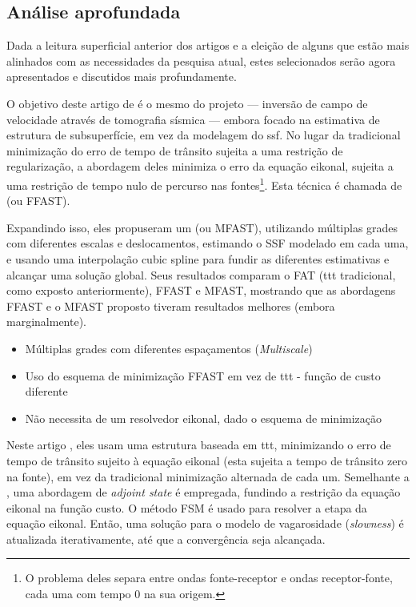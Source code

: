 \subsection{Análise aprofundada}
\label{sec_rt:subsec_deeper-analysis}

Dada a leitura superficial anterior dos artigos e a eleição de alguns que estão mais alinhados com as necessidades da pesquisa atual, estes selecionados serão agora apresentados e discutidos mais profundamente.


O objetivo deste artigo de \cite{li_multiscale_2024} é o mesmo do projeto --- inversão de campo de velocidade através de tomografia sísmica --- embora focado na estimativa de estrutura de subsuperfície, em vez da modelagem do \gls{ssf}. No lugar da tradicional minimização do erro de tempo de trânsito sujeita a uma restrição de regularização, a abordagem deles minimiza o erro da equação eikonal, sujeita a uma restrição de tempo nulo de percurso nas fontes\footnote{O problema deles separa entre ondas fonte-receptor e ondas receptor-fonte, cada uma com tempo $0$ na sua origem.}. Esta técnica é chamada de  (ou FFAST).

Expandindo isso, eles propuseram um  (ou MFAST), utilizando múltiplas grades com diferentes escalas e deslocamentos, estimando o SSF modelado em cada uma, e usando uma interpolação cubic spline para fundir as diferentes estimativas e alcançar uma solução global. Seus resultados comparam o FAT (\gls{ttt} tradicional, como exposto anteriormente), FFAST e MFAST, mostrando que as abordagens FFAST e o MFAST proposto tiveram resultados melhores (embora marginalmente).

\begin{itemize}
	\item Múltiplas grades com diferentes espaçamentos (\textsl{Multiscale})
	\item Uso do esquema de minimização FFAST em vez de \gls{ttt} - função de custo diferente
	\item Não necessita de um resolvedor eikonal, dado o esquema de minimização
\end{itemize}


Neste artigo \cite{shin_distributed_2022}, eles usam uma estrutura baseada em \gls{ttt}, minimizando o erro de tempo de trânsito sujeito à equação eikonal (esta sujeita a tempo de trânsito zero na fonte), em vez da tradicional minimização alternada de cada um. Semelhante a \cite{li_multiscale_2024}, uma abordagem de \textsl{adjoint state} é empregada, fundindo a restrição da equação eikonal na função custo. O método FSM é usado para resolver a etapa da equação eikonal. Então, uma solução para o modelo de vagarosidade (\textsl{slowness}) é atualizada iterativamente, até que a convergência seja alcançada.

